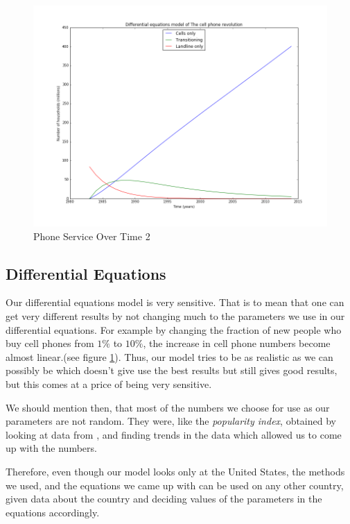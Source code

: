 \documentclass{article}
\begin{document}
\begin{figure}[!ht]
    \centering
    \includegraphics[width=\textwidth]{Differential2.png} 
    \caption{Phone Service Over Time 2}
    \label{13}
\end{figure}

\subsection{Differential Equations}
Our differential equations model is very sensitive. That is to mean that one can get very different results by not changing much to the parameters we use in our differential equations. For example by changing the fraction of new people who buy cell phones from $1\%$ to $10\%$, the increase in cell phone numbers become almost linear.(see figure \ref{13}). Thus, our model tries to be as realistic as we can possibly be which doesn't give use the best results but still gives good results, but this comes at a price of being very sensitive. \par We should mention then, that most of the numbers we choose for use as our parameters are not random. They were, like the \textit{popularity index}, obtained by looking at data from \cite{subscribers}, and finding trends in the data which allowed us to come up with the numbers.\par 
Therefore, even though our model looks only at the United States, the methods we used, and the equations we came up with can be used on any other country, given data about the country and deciding values of the parameters in the equations accordingly.
\end{document}
